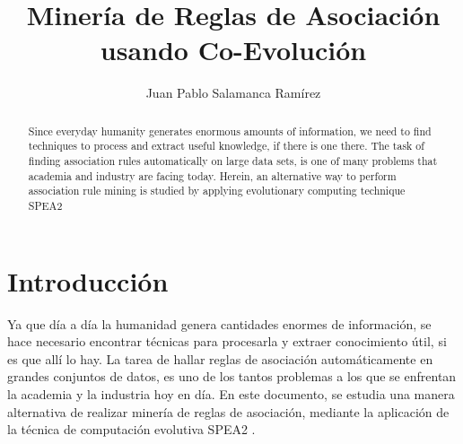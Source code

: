 \documentclass{llncs}
\begin{document}
\title{Minería de Reglas de Asociación usando Co-Evolución}
%
%
\author{Juan Pablo Salamanca Ramírez}
%
%
\tocauthor{}
%

\maketitle

\begin{abstract}
Since everyday humanity generates enormous amounts of information, we need to find techniques to process and extract useful knowledge, if there is one there.
The task of finding association rules automatically on large data sets, is one of many problems that academia and industry are facing today.
Herein, an alternative way to perform association rule mining is studied by applying evolutionary computing technique SPEA2
\end{abstract}
%


\section{Introducción}
 Ya que día a día la humanidad genera cantidades enormes de información, se hace necesario encontrar técnicas para procesarla y extraer conocimiento útil, si es que allí lo hay. 
La tarea de hallar reglas de asociación automáticamente en grandes conjuntos de datos, es uno de los tantos problemas a los que se enfrentan la academia y la industria hoy en día.
En este documento, se estudia una manera alternativa de realizar minería de reglas de asociación, mediante la aplicación de la técnica de computación evolutiva SPEA2 \cite{zitzler:laumans:thiele}.

\end{document}
